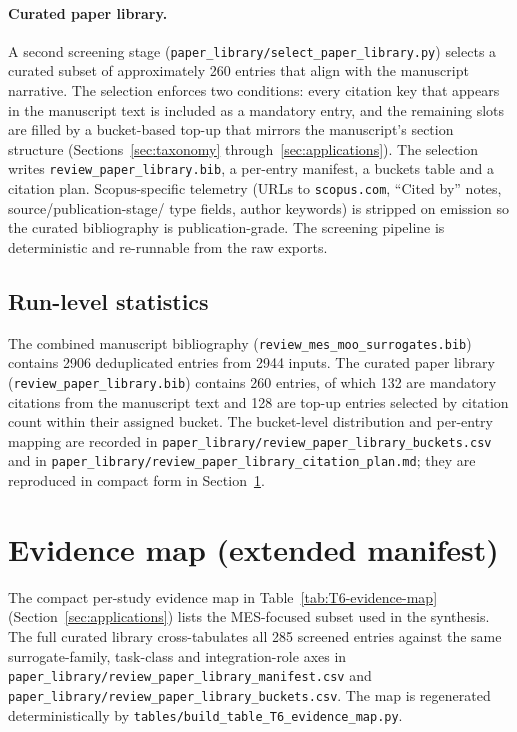 \paragraph{Curated paper library.} A second screening stage
(\texttt{paper\_library/select\_paper\_library.py}) selects a curated
subset of approximately 260 entries that align with the manuscript
narrative. The selection enforces two conditions: every citation key
that appears in the manuscript text is included as a mandatory entry,
and the remaining slots are filled by a bucket-based top-up that
mirrors the manuscript's section structure (Sections~\ref{sec:taxonomy}
through~\ref{sec:applications}). The selection writes
\texttt{review\_paper\_library.bib}, a per-entry manifest, a buckets
table and a citation plan. Scopus-specific telemetry (URLs to
\texttt{scopus.com}, ``Cited by'' notes, source/publication-stage/
type fields, author keywords) is stripped on emission so the curated
bibliography is publication-grade. The screening pipeline is
deterministic and re-runnable from the raw exports.

\subsection{Run-level statistics}
\label{app:search:stats}

The combined manuscript bibliography
(\texttt{review\_mes\_moo\_surrogates.bib}) contains 2906 deduplicated
entries from 2944 inputs. The curated paper library
(\texttt{review\_paper\_library.bib}) contains 260 entries, of which
132 are mandatory citations from the manuscript text and 128 are
top-up entries selected by citation count within their assigned
bucket. The bucket-level distribution and per-entry mapping are
recorded in
\texttt{paper\_library/review\_paper\_library\_buckets.csv} and in
\texttt{paper\_library/review\_paper\_library\_citation\_plan.md};
they are reproduced in compact form in
Section~\ref{app:evidence-map}.

\section{Evidence map (extended manifest)}
\label{app:evidence-map}

The compact per-study evidence map in
Table~\ref{tab:T6-evidence-map} (Section~\ref{sec:applications})
lists the MES-focused subset used in the synthesis. The full curated
library cross-tabulates all 285 screened entries against the same
surrogate-family, task-class and integration-role axes in
\texttt{paper\_library/review\_paper\_library\_manifest.csv} and
\texttt{paper\_library/review\_paper\_library\_buckets.csv}. The
map is regenerated deterministically by
\texttt{tables/build\_table\_T6\_evidence\_map.py}.
